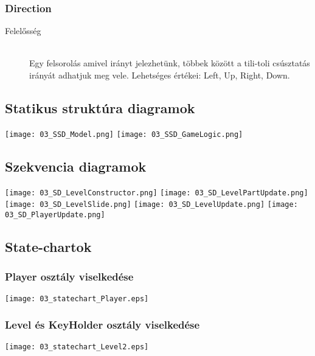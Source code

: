 \subsubsection{Direction}
	\begin{description}
		\item[Felelősség] \hfill \\
		Egy felsorolás amivel irányt jelezhetünk, többek között a tili-toli csúsztatás irányát adhatjuk meg vele. Lehetséges értékei: Left, Up, Right, Down.
	\end{description}
	
\subsection{Statikus struktúra diagramok}
\begin{center}
\texttt{[image: 03\_SSD\_Model.png]}
\newpage
\texttt{[image: 03\_SSD\_GameLogic.png]}
\newpage
\end{center}

\subsection{Szekvencia diagramok}
\begin{center}
\texttt{[image: 03\_SD\_LevelConstructor.png]}
\newpage
\texttt{[image: 03\_SD\_LevelPartUpdate.png]} \\
\texttt{[image: 03\_SD\_LevelSlide.png]}
\newpage
\texttt{[image: 03\_SD\_LevelUpdate.png]}
\newpage
\texttt{[image: 03\_SD\_PlayerUpdate.png]}
\end{center}

\subsection{State-chartok}

\subsubsection{Player osztály viselkedése}

\texttt{[image: 03\_statechart\_Player.eps]}

\newpage

\subsubsection{Level és KeyHolder osztály viselkedése}
\texttt{[image: 03\_statechart\_Level2.eps]}
\newpage
